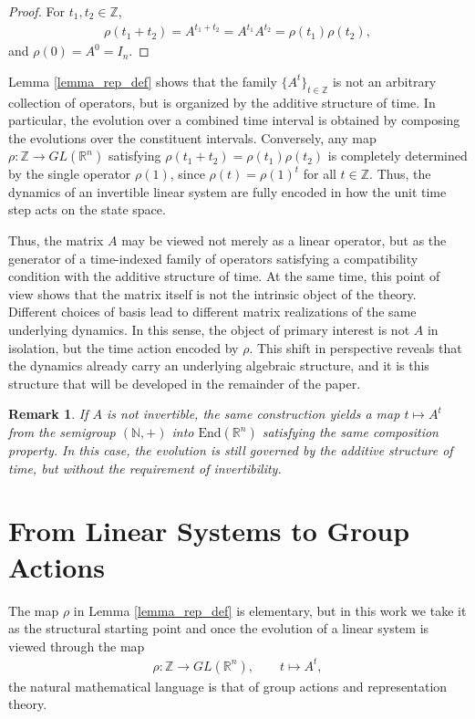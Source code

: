 \documentclass[letterpaper, 9pt, conference]{ieeeconf}
\newtheorem{remark}[theorem]{Remark}
\begin{document}
\begin{proof}
For $t_1,t_2 \in \mathbb{Z}$,
\begin{eqnarray*}
\rho(t_1 + t_2) = A^{t_1 + t_2} = A^{t_1} A^{t_2} = \rho(t_1)\rho(t_2),
\end{eqnarray*}
and $\rho(0) = A^0 = I_n$.
\end{proof}

Lemma \ref{lemma_rep_def} shows that the family $\{A^t\}_{t\in\mathbb{Z}}$ is not
an arbitrary collection of operators, but is organized by the additive structure
of time. In particular, the evolution over a combined time interval is obtained
by composing the evolutions over the constituent intervals. Conversely, any map
$\rho : \mathbb{Z} \to GL(\mathbb{R}^n)$ satisfying
$\rho(t_1+t_2)=\rho(t_1)\rho(t_2)$ is completely determined by the single
operator $\rho(1)$, since $\rho(t)=\rho(1)^t$ for all $t \in \mathbb{Z}$.
Thus, the dynamics of an invertible linear system are fully encoded in how the
unit time step acts on the state space.

Thus, the matrix $A$ may be viewed not merely as a linear operator, but as the
generator of a time-indexed family of operators satisfying a compatibility
condition with the additive structure of time. At the same time, this point of
view shows that the matrix itself is not the intrinsic object of the theory.
Different choices of basis lead to different matrix realizations of the same
underlying dynamics. In this sense, the object of primary interest is not $A$ in
isolation, but the time action encoded by $\rho$. This shift in perspective
reveals that the dynamics already carry an underlying algebraic structure, and
it is this structure that will be developed in the remainder of the paper.

\begin{remark}
If $A$ is not invertible, the same construction yields a map
$t \mapsto A^t$ from the semigroup $(\mathbb{N},+)$ into
$\mathrm{End}(\mathbb{R}^n)$ satisfying the same composition property.
In this case, the evolution is still governed by the additive structure of time,
but without the requirement of invertibility.
\end{remark}



\section{From Linear Systems to Group Actions}\label{sec_group_action}

The map $\rho$ in Lemma \ref{lemma_rep_def} is elementary, but in this work we
take it as the structural starting point and once the evolution of a linear system
is viewed through the map
\begin{eqnarray*}
\rho : \mathbb{Z} \to GL(\mathbb{R}^n), \qquad t \mapsto A^t,
\end{eqnarray*}
the natural mathematical language is that of group actions and representation
theory.
\end{document}
